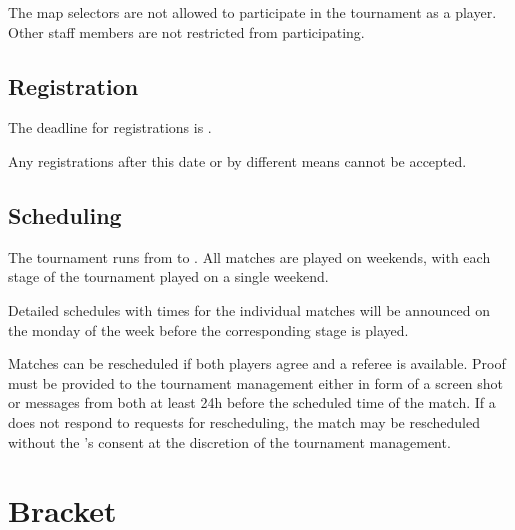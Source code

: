 The map selectors are not allowed to participate in the tournament as a player. Other staff members are not restricted from participating.

\begin{samepage}
\subsection{Registration}

\end{samepage}

The deadline for registrations is \regend.

Any registrations after this date or by different means cannot be accepted.

\customreg

\subsection{Scheduling}

The tournament runs from \tournamentstart{} to \tournamentend. All matches are played on weekends, with each stage of the tournament played on a single weekend.

Detailed schedules with times for the individual matches will be announced on the monday of the week before the corresponding stage is played.

Matches can be rescheduled if both players agree and a referee is available. Proof must be provided to the tournament management either in form of a screen shot or messages from both  at least 24h before the scheduled time of the match.
If a  does not respond to requests for rescheduling, the match may be rescheduled without the 's consent at the discretion of the tournament management.

\customschedule

\section{Bracket}

